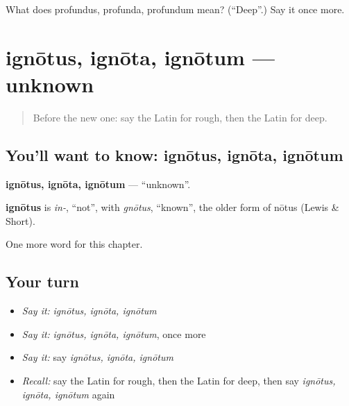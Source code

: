 \begin{tcolorbox}[breakable,colback=teal!4,colframe=teal!35!black,title={Before you move on}]
What does profundus, profunda, profundum mean? (\textquotedblleft{}Deep\textquotedblright{}.) Say it once more.
\end{tcolorbox}
\section[ignōtus, ignōta, ignōtum]{ignōtus, ignōta, ignōtum — unknown}

\label{lesson:LA-C240-ignotus}



\begin{quote}
Before the new one: say the Latin for rough, then the Latin for deep.
\end{quote}

\subsection*{You'll want to know: ignōtus, ignōta, ignōtum}
\textbf{ignōtus, ignōta, ignōtum} — \textquotedblleft{}unknown\textquotedblright{}.

\begin{cousinweb}
\textbf{ignōtus} is \emph{in-}, \textquotedblleft{}not\textquotedblright{}, with \emph{gnōtus}, \textquotedblleft{}known\textquotedblright{}, the older form of nōtus (Lewis \& Short).
\end{cousinweb}

\begin{grammarlens}[title={What you've built}]
One more word for this chapter.
\end{grammarlens}

\subsection*{Your turn}
\begin{itemize}
\raggedright
  \item \emph{Say it:} \emph{ignōtus, ignōta, ignōtum}
  \item \emph{Say it:} \emph{ignōtus, ignōta, ignōtum}, once more
  \item \emph{Say it:} say \emph{ignōtus, ignōta, ignōtum}
  \item \emph{Recall:} say the Latin for rough, then the Latin for deep, then say \emph{ignōtus, ignōta, ignōtum} again
\end{itemize}

